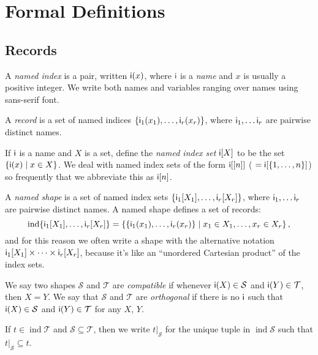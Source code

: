 \documentclass{article}
\newcommand{\tuple}[1]{\{#1\}}
\DeclareMathOperator{\tupleshape}{ind}
\newcommand{\tuplerestrict}[2]{\left.#1\right|_{#2}}
\begin{document}
\section{Formal Definitions}
\label{sec:definitions}

\newcommand{\sub}[1]{_\text{$#1$}}

\subsection{Records}

A \emph{named index} is a pair, written $\mathsf{i}(x)$, where $\mathsf{i}$ is a \emph{name} and $x$ is usually a positive integer. We write both names and variables ranging over names using sans-serif font.

A \emph{record} is a set of named indices $\tuple{\nidx{i\sub{1}}{x_1}, \ldots, \nidx{i\sub{r}}{x_r}}$, where $\name{i\sub{1}}, \ldots \name{i\sub{r}}$ are pairwise distinct names. 

If $\mathsf{i}$ is a name and $X$ is a set, define the \emph{named index set} $\mathsf{i}[X]$ to be the set $\{\mathsf{i}(x) \mid x \in X\}$. We deal with named index sets of the form $\mathsf{i}[[n]]$ (${}=\mathsf{i}[\{1, \ldots, n\}]$) so frequently that we abbreviate this as $\mathsf{i}[n]$.

A \emph{named shape} is a set of named index sets $\{\nset{i\sub{1}}{X_1}, \ldots, \nset{i\sub{r}}{X_r}\}$, where $\name{i\sub{1}}, \ldots \name{i\sub{r}}$ are pairwise distinct names. A named shape defines a set of records:
\begin{equation*}
\tupleshape \{\nset{i\sub{1}}{X_1}, \ldots, \nset{i\sub{r}}{X_r}\} = \left\{\tuple{\nidx{i\sub{1}}{x_1}, \ldots, \nidx{i\sub{r}}{x_r}} \mid x_1 \in X_1, \ldots, x_r \in X_r\right\},
\end{equation*}
and for this reason we often write a shape with the alternative notation $\nset{i\sub{1}}{X_1} \times \cdots \times \nset{i\sub{r}}{X_r}$, because it's like an ``unordered Cartesian product'' of the index sets.

We say two shapes $\mathcal{S}$ and $\mathcal{T}$ are \emph{compatible} if whenever $\mathsf{i}(X) \in \mathcal{S}$ and $\mathsf{i}(Y) \in \mathcal{T}$, then $X = Y$. We say that $\mathcal{S}$ and $\mathcal{T}$ are \emph{orthogonal} if there is no $\mathsf{i}$ such that $\mathsf{i}(X) \in \mathcal{S}$ and $\mathsf{i}(Y) \in \mathcal{T}$ for any $X$, $Y$.

If $t \in \tupleshape \mathcal{T}$ and $\mathcal{S} \subseteq \mathcal{T}$, then we write $\tuplerestrict{t}{\mathcal{S}}$ for the unique tuple in $\tupleshape{\mathcal{S}}$ such that $\tuplerestrict{t}{\mathcal{S}} \subseteq t$.
\end{document}
